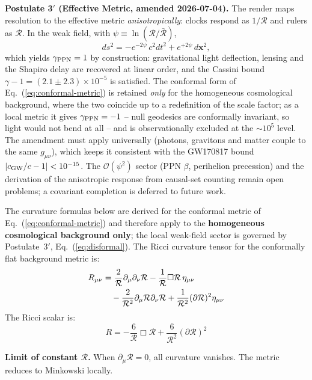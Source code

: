 \documentclass[12pt]{article}
\begin{document}
{\bf Postulate 3$'$ (Effective Metric, amended 2026-07-04).} The render maps resolution to the effective metric \emph{anisotropically}: clocks respond as $1/\mathcal{R}$ and rulers as $\mathcal{R}$. In the weak field, with $\psi \equiv \ln(\mathcal{R}/\bar{\mathcal{R}})$,
\begin{equation}
ds^2 = -e^{-2\psi}\,c^2dt^2 + e^{+2\psi}\,d\mathbf{x}^2,
\label{eq:disformal}
\end{equation}
which yields $\gamma_{\rm PPN}=1$ by construction: gravitational light deflection, lensing and the Shapiro delay are recovered at linear order, and the Cassini bound $\gamma-1=(2.1\pm2.3)\times10^{-5}$ is satisfied. The conformal form of Eq.~(\ref{eq:conformal-metric}) is retained \emph{only} for the homogeneous cosmological background, where the two coincide up to a redefinition of the scale factor; as a local metric it gives $\gamma_{\rm PPN}=-1$ -- null geodesics are conformally invariant, so light would not bend at all -- and is observationally excluded at the $\sim10^5$ level. The amendment must apply universally (photons, gravitons and matter couple to the same $g_{\mu\nu}$), which keeps it consistent with the GW170817 bound $|c_{\rm GW}/c-1|<10^{-15}$. The $\mathcal{O}(\psi^2)$ sector (PPN $\beta$, perihelion precession) and the derivation of the anisotropic response from causal-set counting remain open problems; a covariant completion is deferred to future work.

The curvature formulas below are derived for the conformal metric of Eq.~(\ref{eq:conformal-metric}) and therefore apply to the {\bf homogeneous cosmological background only}; the local weak-field sector is governed by Postulate~3$'$, Eq.~(\ref{eq:disformal}). The Ricci curvature tensor for the conformally flat background metric is:
\begin{align}
R_{\mu\nu} &= \frac{2}{\mathcal{R}}\partial_\mu\partial_\nu\mathcal{R} - \frac{1}{\mathcal{R}}\Box\mathcal{R}\,\eta_{\mu\nu} \notag\\
&\quad - \frac{2}{\mathcal{R}^2}\partial_\mu\mathcal{R}\partial_\nu\mathcal{R} + \frac{1}{\mathcal{R}^2}(\partial\mathcal{R})^2\eta_{\mu\nu}
\end{align}
The Ricci scalar is:
\begin{equation}
R = -\frac{6}{\mathcal{R}}\Box\mathcal{R} + \frac{6}{\mathcal{R}^2}(\partial\mathcal{R})^2
\end{equation}

{\bf Limit of constant $\mathcal{R}$.} When $\partial_\mu\mathcal{R} = 0$, all curvature vanishes. The metric reduces to Minkowski locally.
\end{document}
